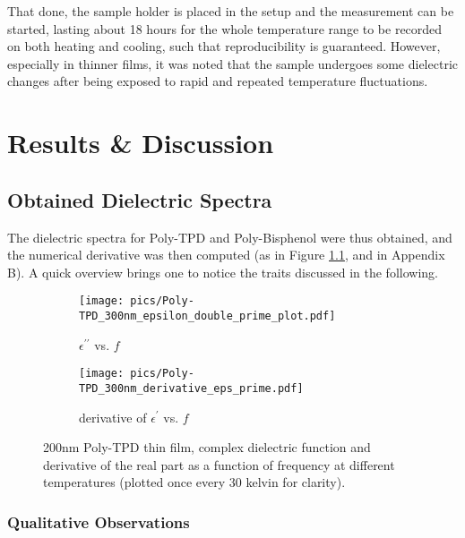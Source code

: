 That done, the sample holder is placed in the setup and the measurement can be started, lasting about 18 hours for the whole temperature range to be recorded on both heating and cooling, such that reproducibility is guaranteed. However, especially in thinner films, it was noted that the sample undergoes some dielectric changes after being exposed to rapid and repeated temperature fluctuations.

\chapter{Results \& Discussion}

\section{Obtained Dielectric Spectra}
The dielectric spectra for Poly-TPD and Poly-Bisphenol were thus obtained, and the numerical derivative was then computed (as in Figure \ref{300tpd}, and in Appendix B). A quick overview brings one to notice the traits discussed in the following.
%

\begin{figure}[!htb]
\centering
\begin{subfigure}[t]{.5\textwidth}
  \centering
  \texttt{[image: pics/Poly-TPD\_300nm\_epsilon\_double\_prime\_plot.pdf]}
  \caption{$\epsilon^{\prime\prime}$ vs. $f$}
\end{subfigure}%
\begin{subfigure}[t]{.5\textwidth}
  \centering
  \texttt{[image: pics/Poly-TPD\_300nm\_derivative\_eps\_prime.pdf]}
  \caption{derivative of $\epsilon^\prime$ vs. $f$}
\end{subfigure}
\caption{200nm Poly-TPD thin film, complex dielectric function and derivative of the real part as a function of frequency at different temperatures (plotted once every 30 kelvin for clarity).}
  \label{300tpd}
\end{figure}
\subsection{Qualitative Observations}

